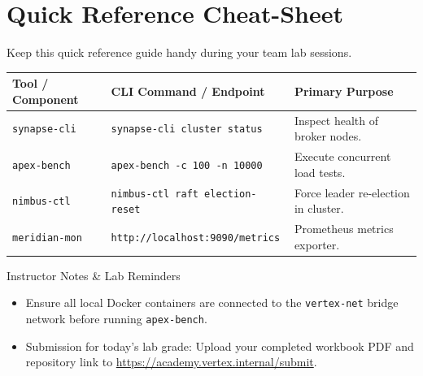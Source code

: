 \documentclass[11pt, a4paper, parskip=half]{scrartcl}
\begin{document}
\vspace{2pt}

\section{Quick Reference Cheat-Sheet}

Keep this quick reference guide handy during your team lab sessions.

\vspace{2pt}
\begin{center}
\small
\begin{tabularx}{\textwidth}{l X X}
\toprule
\textbf{Tool / Component} & \textbf{CLI Command / Endpoint} & \textbf{Primary Purpose} \\
\midrule
\texttt{synapse-cli} & \texttt{\footnotesize synapse-cli cluster status} & Inspect health of broker nodes. \\
\texttt{apex-bench} & \texttt{\footnotesize apex-bench -c 100 -n 10000} & Execute concurrent load tests. \\
\texttt{nimbus-ctl} & \texttt{\footnotesize nimbus-ctl raft election-reset} & Force leader re-election in cluster. \\
\texttt{meridian-mon} & \texttt{\footnotesize http://localhost:9090/metrics} & Prometheus metrics exporter. \\
\bottomrule
\end{tabularx}
\end{center}

\vspace{2pt}

\begin{infobox}{Instructor Notes \& Lab Reminders}
    \begin{itemize}[leftmargin=14pt, itemsep=1pt]
        \item Ensure all local Docker containers are connected to the \texttt{vertex-net} bridge network before running \texttt{apex-bench}.
        \item Submission for today's lab grade: Upload your completed workbook PDF and repository link to \url{https://academy.vertex.internal/submit}.
    \end{itemize}
\end{infobox}
\end{document}
